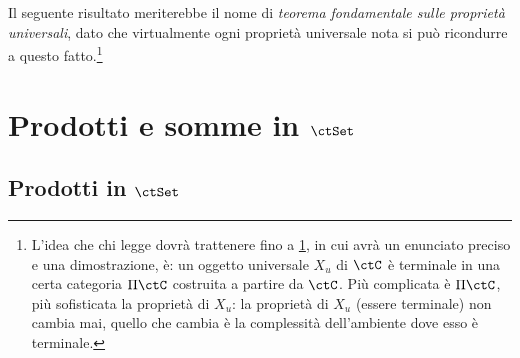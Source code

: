 



Il seguente risultato meriterebbe il nome di \emph{teorema fondamentale sulle proprietà universali}, dato che virtualmente ogni proprietà universale nota si può ricondurre a questo fatto.\footnote{L'idea che chi legge dovrà trattenere fino a \ref{}, in cui avrà un enunciato preciso e una dimostrazione, è: un oggetto universale \(X_u\) di \(\ctC\) è terminale in una certa categoria \(\Pi\ctC\) costruita a partire da \(\ctC\). Più complicata è \(\Pi\ctC\), più sofisticata la proprietà di \(X_u\): la proprietà di \(X_u\) (essere terminale) non cambia mai, quello che cambia è la complessità dell'ambiente dove esso è terminale.}
\begin{proposition}
\end{proposition}
\begin{remark}
\end{remark}


\section{Prodotti e somme in \(\ctSet\)}

\subsection*{Prodotti in \(\ctSet\)}\label{prod_in_Set}

